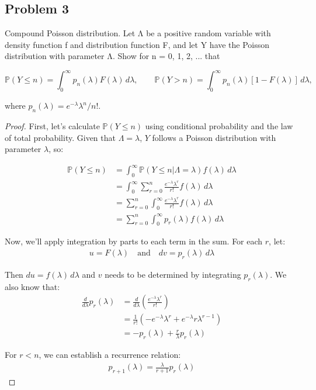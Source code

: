 \documentclass[letterpaper, 11pt]{article}
\newcommand{\1}{\mathds{1}}	%
\theoremstyle{definition}
\begin{document}
\subsection*{Problem 3}
Compound Poisson distribution. Let Λ be a positive random variable with density function f and distribution function F, and let Y have the Poisson distribution with parameter Λ. Show for n = 0, 1, 2, ... that

$$\mathbb{P}(Y \leq n) = \int_{0}^{\infty} p_n(\lambda)F(\lambda)\,d\lambda,\quad\quad\mathbb{P}(Y > n) = \int_{0}^{\infty} p_n(\lambda)[1 - F(\lambda)]\,d\lambda,$$

where $p_n(\lambda) = e^{-\lambda}\lambda^n/n!$.
\begin{proof}
    First, let's calculate $\mathbb{P}(Y \leq n)$ using conditional probability and the law of total probability. Given that $\Lambda = \lambda$, $Y$ follows a Poisson distribution with parameter $\lambda$, so:

\begin{align*}
\mathbb{P}(Y \leq n) &= \int_{0}^{\infty} \mathbb{P}(Y \leq n | \Lambda = \lambda) f(\lambda) \, d\lambda \\
&= \int_{0}^{\infty} \sum_{r=0}^{n} \frac{e^{-\lambda}\lambda^r}{r!} f(\lambda) \, d\lambda \\
&= \sum_{r=0}^{n} \int_{0}^{\infty} \frac{e^{-\lambda}\lambda^r}{r!} f(\lambda) \, d\lambda \\
&= \sum_{r=0}^{n} \int_{0}^{\infty} p_r(\lambda) f(\lambda) \, d\lambda
\end{align*}

Now, we'll apply integration by parts to each term in the sum. For each $r$, let:
\begin{align*}
u = F(\lambda) \quad \text{and} \quad dv = p_r(\lambda) \, d\lambda
\end{align*}

Then $du = f(\lambda) \, d\lambda$ and $v$ needs to be determined by integrating $p_r(\lambda)$. We also know that:
\begin{align*}
\frac{d}{d\lambda}p_r(\lambda) &= \frac{d}{d\lambda}\left(\frac{e^{-\lambda}\lambda^r}{r!}\right) \\
&= \frac{1}{r!}\left(-e^{-\lambda}\lambda^r + e^{-\lambda}r\lambda^{r-1}\right) \\
&= -p_r(\lambda) + \frac{r}{\lambda}p_r(\lambda)
\end{align*}

For $r < n$, we can establish a recurrence relation:
\begin{align*}
p_{r+1}(\lambda) = \frac{\lambda}{r+1}p_r(\lambda)
\end{align*}


\end{proof}
\end{document}
